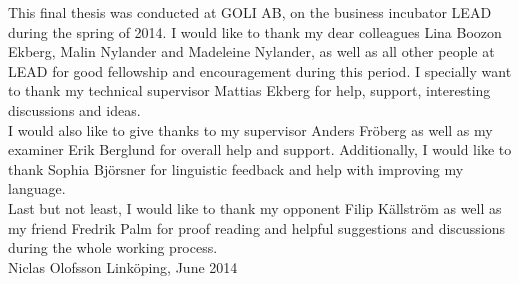 This final thesis was conducted at GOLI AB, on the business incubator
LEAD during the spring of 2014. I would like to thank my dear colleagues
Lina Boozon Ekberg, Malin Nylander and Madeleine Nylander, as well as
all other people at LEAD for good fellowship and encouragement during
this period. I specially want to thank my technical supervisor Mattias
Ekberg for help, support, interesting discussions and ideas.\\

I would also like to give thanks to my supervisor Anders Fröberg as well
as my examiner Erik Berglund for overall help and support. Additionally,
I would like to thank Sophia Björsner for linguistic feedback and help
with improving my language.\\

Last but not least, I would like to thank my opponent Filip Källström as
well as my friend Fredrik Palm for proof reading and helpful suggestions
and discussions during the whole working process.\\

Niclas Olofsson\newline
Linköping, June 2014
